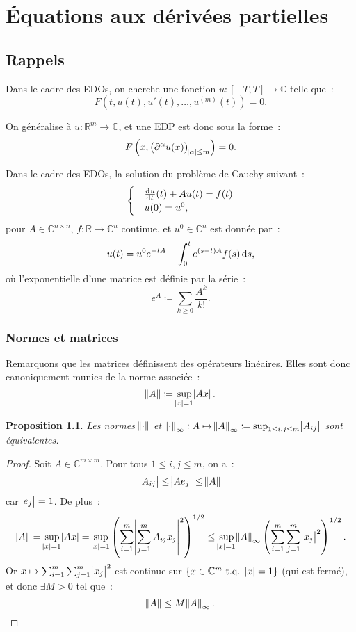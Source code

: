 \documentclass{report}
\newcommand{\C}{{\mathbb C}}
\newcommand{\R}{{\mathbb R}}
\newcommand{\tq}{\text{ t.q. }}
\newcommand{\st}{\tq}
\newtheorem{prp}[thm]{Proposition}
\theoremstyle{definition}
\theoremstyle{remark}
\begin{document}
\chapter{Équations aux dérivées partielles}
\section{Rappels}
Dans le cadre des EDOs, on cherche une fonction $u : [-T, T] \to \C$ telle que~:
\[F(t, u(t), u'(t), \ldots, u^{(m)}(t)) = 0.\]

On généralise à $u : \R^m \to \C$, et une EDP est donc sous la forme~:
\[F\left(x, \left(\partial^\alpha u(x)\right)_{\abs \alpha \leq m}\right) = 0.\]

Dans le cadre des EDOs, la solution du problème de Cauchy suivant~:
\[\begin{cases}&\od ut(t) + Au(t) = f(t) \\&u(0) = u^0,\end{cases}\]
pour $A \in \C^{n \times n}$, $f : \R \to \C^n$ continue, et $u^0 \in \C^n$ est donnée par~:
\[u(t) = u^0e^{-tA} + \int_0^te^{(s-t)A}f(s)\dif s,\]
où l'exponentielle d'une matrice est définie par la série~:
\[e^A \coloneqq \sum_{k \geq 0}\frac {A^k}{k!}.\]

\subsection{Normes et matrices}
Remarquons que les matrices définissent des opérateurs linéaires. Elles sont donc canoniquement munies de la norme associée~:
\[\norm A \coloneqq \sup_{\abs x = 1}\abs {Ax}.\]

\begin{prp} Les normes $\norm \cdot$ et $\norm \cdot_\infty : A \mapsto \norm A_\infty \coloneqq \sup_{1 \leq i,j \leq m}\abs {A_{ij}}$ sont équivalentes.
\end{prp}

\begin{proof} Soit $A \in \C^{m \times m}$. Pour tous $1 \leq i, j \leq m$, on a~:
\[\abs {A_{ij}} \leq \abs {Ae_j} \leq \norm A\]
car $\abs {e_j} = 1$. De plus~:
\[\norm A = \sup_{\abs x = 1}\abs {Ax} = \sup_{\abs x = 1}\left(\sum_{i=1}^m\abs {\sum_{j=1}^mA_{ij}x_j}^2\right)^{1/2}
\leq \sup_{\abs x = 1}\norm A_\infty\left(\sum_{i=1}^m\sum_{j=1}^m\abs {x_j}^2\right)^{1/2}.\]
Or $x \mapsto \sum_{i=1}^m\sum_{j=1}^m\abs {x_j}^2$ est continue sur $\{x \in \C^m \st \abs x = 1\}$ (qui est fermé), et donc $\exists M > 0$ tel que~:
\[\norm A \leq M\norm A_\infty.\]
\end{proof}
\end{document}
